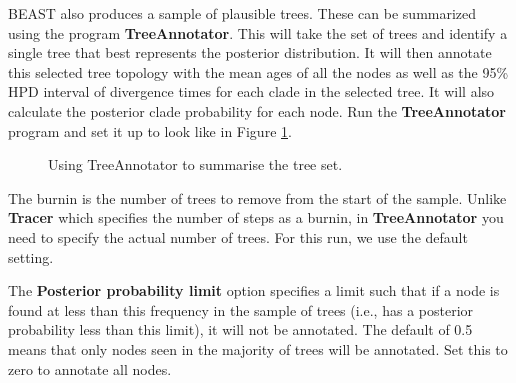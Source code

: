 \documentclass{article}
\begin{document}
BEAST also produces a sample of plausible trees. 
These can be summarized using the program {\bf TreeAnnotator}. This will take the set of trees and identify a single tree that best represents the posterior distribution. It will then annotate this selected tree topology with the mean ages of all the
nodes as well as the 95\% HPD interval of divergence times for each clade in the selected tree. It will also calculate the posterior clade probability for each
node. Run the {\bf TreeAnnotator} program and set it up to look like in Figure \ref{fig.TreeAnnotator}.

\begin{figure}
\begin{center}


\end{center}
\caption{\label{fig.TreeAnnotator} Using TreeAnnotator to summarise the tree set.}
\end{figure}


The burnin is the number of trees to remove from the start of the sample. Unlike {\bf Tracer} which specifies the number of steps as a burnin, in {\bf TreeAnnotator} you need to specify the actual number of trees. For this run, we use the default setting.

The {\bf Posterior probability limit} option specifies a limit such that if a node is found at less than this frequency in the sample of trees (i.e., has a posterior probability less than this limit), it will not be annotated. The default of 0.5 means that only nodes seen in the majority of trees will be annotated. Set this to zero to annotate all nodes.
\end{document}
